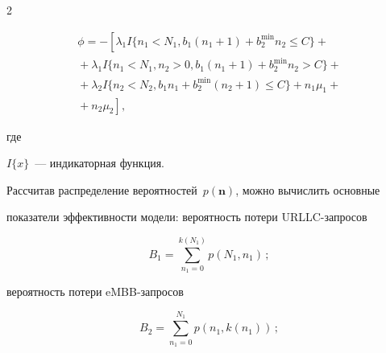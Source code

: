 \begin{multicols}{2}
\vspace*{-13pt}





\noindent


\begin{multline*}


\phi = -\left[\lambda_1  I\{n_1 <N_1, b_1 (n_1 +1) + b_2^{\min} n_2 \leq C\} + {}\right.\\


{}+\lambda_1  I\{n_1 < N_1, n_2 > 0, b_1 (n_1 +1) + b_2^{\min} n_2 > C\} + {}\\


{}+\lambda_2  I\{n_2 < N_2, b_1 n_1 + b_2^{\min} (n_2 +1) \leq C\} + n_1 


\mu_1 +{}\\


\left.{}+ n_2 \mu_2\right],


\end{multline*}


где


$I\{x\}$~--- индикаторная функция.





Рассчитав распределение вероятностей~$p(\mathbf{n})$, можно вычислить основные 


показатели эффективности модели: ве\-ро\-ят\-ность потери URLLC-за\-просов





\vspace*{-2pt}





\noindent 


$$


B_1 = \sum\limits_{n_1=0}^{k(N_1)}{p(N_1, n_1)}\,;


$$





\vspace*{-2pt}





\noindent


 ве\-ро\-ят\-ность потери eMBB-за\-про\-сов 


 $$


 B_2 = 


\sum\limits_{n_1=0}^{N_1}{p(n_1, k(n_1))}\,;


$$



\end{multicols}
